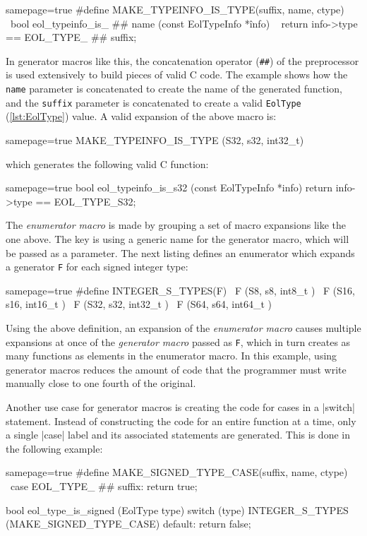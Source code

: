 \begin{ccode*}{samepage=true}
#define MAKE_TYPEINFO_IS_TYPE(suffix, name, ctype)            \
    bool eol_typeinfo_is_ ## name (const EolTypeInfo *înfo) \
    { return info->type == EOL_TYPE_ ## suffix; }
\end{ccode*}

\noindent In generator macros like this, the concatenation operator
(\verb|##|) of the preprocessor is used extensively to build pieces of valid
C code. The example shows how the \verb|name| parameter is concatenated to
create the name of the generated function, and the \verb|suffix| parameter is
concatenated to create a valid \verb|EolType| (\autoref{lst:EolType})
value. A valid expansion of the above macro is:

\begin{ccode*}{samepage=true}
MAKE_TYPEINFO_IS_TYPE (S32, s32, int32_t)
\end{ccode*}

\noindent
which generates the following valid C function:

\begin{ccode*}{samepage=true}
  bool eol_typeinfo_is_s32 (const EolTypeInfo *info)
  { return info->type == EOL_TYPE_S32; }
\end{ccode*}

\noindent The \emph{enumerator macro} is made by grouping a set of macro
expansions like the one above. The key is using a generic name for the
generator macro, which will be passed as a parameter. The next listing defines
an enumerator which expands a generator \verb|F| for each signed integer type:

\begin{ccode*}{samepage=true}
#define INTEGER_S_TYPES(F) \
    F (S8,  s8,  int8_t  ) \
    F (S16, s16, int16_t ) \
    F (S32, s32, int32_t ) \
    F (S64, s64, int64_t )
\end{ccode*}

\noindent Using the above definition, an expansion of the \emph{enumerator
macro} causes multiple expansions at once of the \emph{generator macro} passed
as \verb|F|, which in turn creates as many functions as elements in the
enumerator macro. In this example, using generator macros reduces the amount
of code that the programmer must write manually close to one fourth of the
original.

Another use case for generator macros is creating the code for cases in
a \Mc|switch| statement. Instead of constructing the code for an entire
function at a time, only a single \Mc|case| label and its associated
statements are generated. This is done in the following example:

\begin{ccode*}{samepage=true}
#define MAKE_SIGNED_TYPE_CASE(suffix, name, ctype) \
    case EOL_TYPE_ ## suffix: return true;

bool eol_type_is_signed (EolType type) {
  switch (type) {
    INTEGER_S_TYPES (MAKE_SIGNED_TYPE_CASE)
    default: return false;
  }
}
\end{ccode*}

